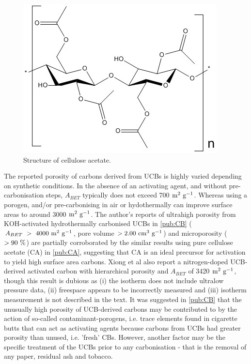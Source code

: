 \begin{figure}[h]
    \centering
    \includegraphics[width=0.7\columnwidth, keepaspectratio]{4-cbs/figs/cellulose_acetate.jpg}
    \caption{Structure of cellulose acetate.}
    \label{fig:cellulose acetate}
\end{figure}

The reported porosity of carbons derived from UCBs is highly varied depending on synthetic conditions. In the absence of an activating agent, and without pre-carbonisation steps, $A_{BET}$ typically does not exceed 700 $\rm m^2\ g^{-1}$.\citep{Koochaki2019, Soltani2013, Yazdi2012, Lee2014, Hamzah2017} Whereas using a porogen, and/or pre-carbonising in air or hydothermally can improve surface areas to around 3000 $\rm m^2\ g^{-1}$.\citep{xiong2018, Koochaki2019, Sun2017, Bilge2019} The author's reports of ultrahigh porosity from KOH-activated hydrothermally carbonised UCBs in \ref{pub:CB} ($A_{BET}\ \rm >\ 4000\ m^2\ g^{-1} $, pore volume $\rm > 2.00\ cm^3\ g^{-1}$) and microporosity ($\rm > 90\ \%$) are partially corroborated by the similar results using pure cellulose acetate (CA) in \ref{pub:CA}, suggesting that CA is an ideal precursor for activation to yield high surface area carbons. Xiong et al also report a nitrogen-doped UCB-derived activated carbon with hierarchical porosity and $A_{BET}$ of 3420 $\rm m^2\ g^{-1}$, though this result is dubious as (i) the  isotherm does not include ultralow pressure data, (ii) freespace appears to be incorrectly measured and (iii) isotherm measurement is not described in the text.\citep{xiong2019nitrogen} It was suggested in \ref{pub:CB} that the unusually high porosity of UCB-derived carbons may be contributed to by the action of so-called contaminant-porogens, i.e. trace elements found in cigarette butts that can act as activating agents because carbons from UCBs had greater porosity than unused, i.e. 'fresh' CBs. However, another factor may be the specific treatment of the UCBs prior to any carbonisation - that is the removal of any paper, residual ash and tobacco.

